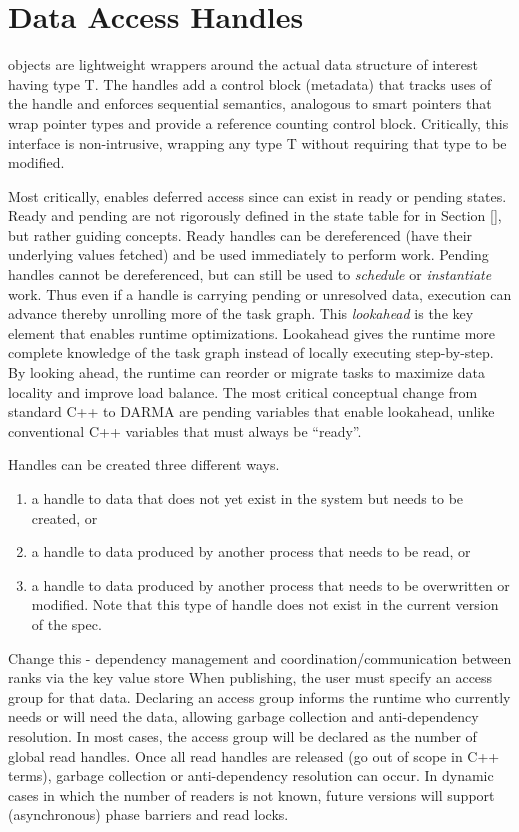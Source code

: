 

\section{Data Access Handles}
\label{sec:handles}
 objects are lightweight wrappers around the actual data structure of interest having type T. 
The handles add a control block (metadata) that tracks uses of the handle and enforces
\gls{sequential semantics}, analogous to smart pointers that wrap pointer types and provide a reference counting control block.
Critically, this interface is non-intrusive, wrapping any type T without requiring that type to be modified.

Most critically,  enables deferred access since \ahandle can exist in ready or pending states. 
Ready and pending are not rigorously defined in the state table for \ahandle in Section \ref{}, but rather guiding concepts.
Ready handles can be dereferenced (have their underlying values fetched) and be used immediately to perform work.
Pending handles cannot be dereferenced, but can still be used to \emph{schedule} or \emph{instantiate} work.
Thus even if a handle is carrying pending or unresolved data, execution can advance thereby unrolling more of the task graph.
This \emph{lookahead} is the key element that enables runtime optimizations.
Lookahead gives the runtime more complete knowledge of the task graph instead of locally executing step-by-step.
By looking ahead, the runtime can reorder or migrate tasks to maximize data locality and improve load balance.
The most critical conceptual change from standard C++ to DARMA are pending variables that enable lookahead, unlike conventional C++ variables that must always be ``ready''.

Handles can be created three different ways.
\begin{enumerate}
\item a handle to data that does not yet exist in the system
but needs to be created, or
\item a handle to data produced by another process that needs to
be read, or 
\item a handle to data produced by another process that needs to be overwritten or modified. 
Note that this type of handle does not exist in the current version of the spec.
\end{enumerate}
Change this - dependency management and coordination/communication between
ranks via the key value store
When publishing, the user must specify an \gls{access group}
for that data.  Declaring an access group informs the runtime who currently needs or will need the data,  
allowing garbage collection and \gls{anti-dependency} resolution.
In most cases, the access group will be declared as the number of global read handles.
Once all read handles are released (go out of scope in C++ terms), garbage collection or anti-dependency resolution can occur.
In dynamic cases in which the number of readers is not known,
future versions will support (asynchronous) phase barriers and read locks.

